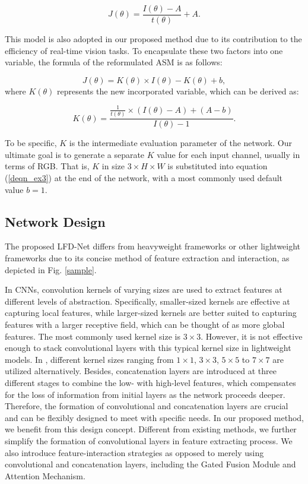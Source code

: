 \documentclass[lettersize,journal]{IEEEtran}
\begin{document}
\begin{equation}
    \label{deqn_ex2}
    J(\theta) = \frac{I(\theta) - A}{t(\theta)} + A.
\end{equation}

This model is also adopted in our proposed method due to its contribution to the efficiency of real-time vision tasks. To encapsulate these two factors into one variable, the formula of the reformulated ASM is as follows:

\begin{equation}
    \label{deqn_ex3}
    J(\theta) = K(\theta) \times I(\theta) - K(\theta) + b,
\end{equation}
where $K(\theta)$ represents the new incorporated variable, which can be derived as:

\begin{equation}
    \label{deqn_ex4}
    K(\theta) = \frac{\frac{1}{t(\theta)} \times (I(\theta) - A) + (A - b)}{I(\theta) - 1}.
\end{equation}

To be specific, $K$ is the intermediate evaluation parameter of the network. Our ultimate goal is to generate a separate $K$ value for each input channel, usually in terms of RGB. That is, $K$ in size $3 \times H \times W$ is substituted into equation (\ref{deqn_ex3}) at the end of the network, with a most commonly used default value $b = 1$.

\subsection{Network Design}
The proposed LFD-Net differs from heavyweight frameworks or other lightweight frameworks due to its concise method of feature extraction and interaction, as depicted in Fig. \ref{sample}.

In CNNs, convolution kernels of varying sizes are used to extract features at different levels of abstraction. Specifically, smaller-sized kernels are effective at capturing local features, while larger-sized kernels are better suited to capturing features with a larger receptive field, which can be thought of as more global features. The most commonly used kernel size is $3 \times 3$. However, it is not effective enough to stack convolutional layers with this typical kernel size in lightweight models. In \cite{ullah2021light}, different kernel sizes ranging from $1\times 1$, $3\times 3$, $5\times 5$ to $7\times 7$ are utilized alternatively. Besides, concatenation layers are introduced at three different stages to combine the low- with high-level features, which compensates for the loss of information from initial layers as the network proceeds deeper. Therefore, the formation of convolutional and concatenation layers are crucial and can be flexibly designed to meet with specific needs. In our proposed method, we benefit from this design concept. Different from existing methods, we further simplify the formation of convolutional layers in feature extracting process. We also introduce feature-interaction strategies as opposed to merely using convolutional and concatenation layers, including the Gated Fusion Module and Attention Mechanism. 
\end{document}
